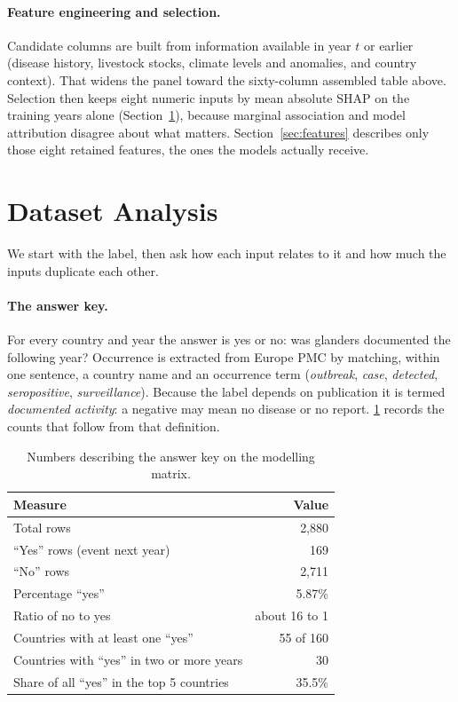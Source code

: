 \documentclass[10pt,openany]{report}
\begin{document}
\paragraph{Feature engineering and selection.}
Candidate columns are built from information available in year $t$ or earlier (disease history,
livestock stocks, climate levels and anomalies, and country context). That widens the panel toward
the sixty-column assembled table above. Selection then keeps eight numeric inputs by mean absolute
SHAP on the training years alone (Section~\ref{sec:analysis}), because marginal association and
model attribution disagree about what matters. Section~\ref{sec:features} describes only those eight
retained features, the ones the models actually receive.

\section{Dataset Analysis}
\label{sec:analysis}

We start with the label, then ask how each input relates to it and how much the inputs duplicate each
other.

\paragraph{The answer key.}
For every country and year the answer is yes or no: was glanders documented the following year?
Occurrence is extracted from Europe PMC by matching, within one sentence, a country name and an
occurrence term (\emph{outbreak}, \emph{case}, \emph{detected}, \emph{seropositive},
\emph{surveillance}). Because the label depends on publication it is termed \emph{documented
activity}: a negative may mean no disease or no report. \cref{tab:answer-key} records the counts
that follow from that definition.

\begin{table}[htbp]
\centering
\caption{Numbers describing the answer key on the modelling matrix.}
\label{tab:answer-key}
\small
\begin{tabular}{@{}lr@{}}
\toprule
\textbf{Measure} & \textbf{Value} \\
\midrule
Total rows & 2,880 \\
``Yes'' rows (event next year) & 169 \\
``No'' rows & 2,711 \\
Percentage ``yes'' & 5.87\% \\
Ratio of no to yes & about 16 to 1 \\
Countries with at least one ``yes'' & 55 of 160 \\
Countries with ``yes'' in two or more years & 30 \\
Share of all ``yes'' in the top 5 countries & 35.5\% \\
\bottomrule
\end{tabular}
\end{table}
\end{document}

